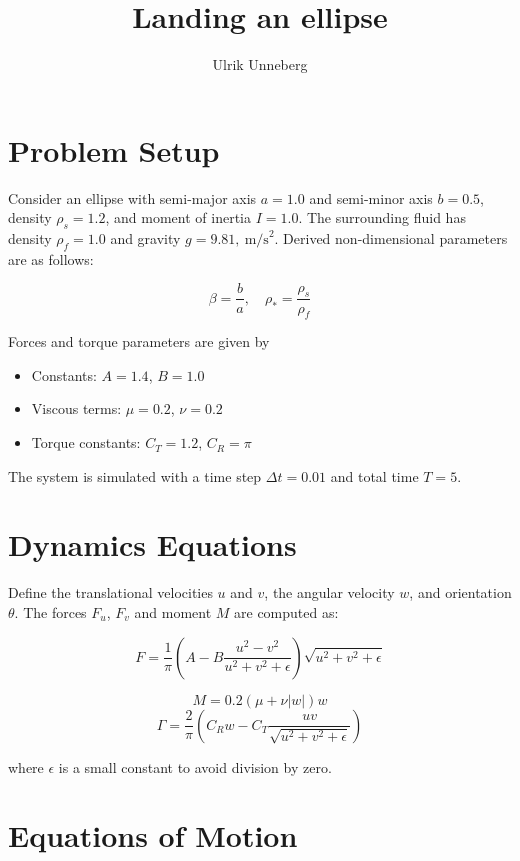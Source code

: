 \documentclass{article}
\author{Ulrik Unneberg}
\begin{document}
\title{Landing an ellipse}
\maketitle

\section*{Problem Setup}

Consider an ellipse with semi-major axis \( a = 1.0 \) and semi-minor axis \( b = 0.5 \), density \( \rho_s = 1.2 \), and moment of inertia \( I = 1.0 \). The surrounding fluid has density \( \rho_f = 1.0 \) and gravity \( g = 9.81, \ \text{m/s}^2 \). Derived non-dimensional parameters are as follows:

\[
\beta = \frac{b}{a}, \quad \rho_* = \frac{\rho_s}{\rho_f}
\]

Forces and torque parameters are given by
\begin{itemize}
    \item Constants: \( A = 1.4 \), \( B = 1.0 \)
    \item Viscous terms: \( \mu = 0.2 \), \( \nu = 0.2 \)
    \item Torque constants: \( C_T = 1.2 \), \( C_R = \pi \)
\end{itemize}

The system is simulated with a time step \( \Delta t = 0.01 \) and total time \( T = 5 \).

\section*{Dynamics Equations}

Define the translational velocities \( u \) and \( v \), the angular velocity \( w \), and orientation \( \theta \). The forces \( F_u \), \( F_v \) and moment \( M \) are computed as:

\[
F = \frac{1}{\pi} \left( A - B \frac{u^2 - v^2}{u^2 + v^2 + \epsilon} \right) \sqrt{u^2 + v^2 + \epsilon}
\]

\[
M = 0.2 (\mu + \nu |w|) w
\]
\[
\Gamma = \frac{2}{\pi} \left( C_R w - C_T \frac{u v}{\sqrt{u^2 + v^2 + \epsilon}} \right)
\]

where \( \epsilon \) is a small constant to avoid division by zero.

\section*{Equations of Motion}
\end{document}
